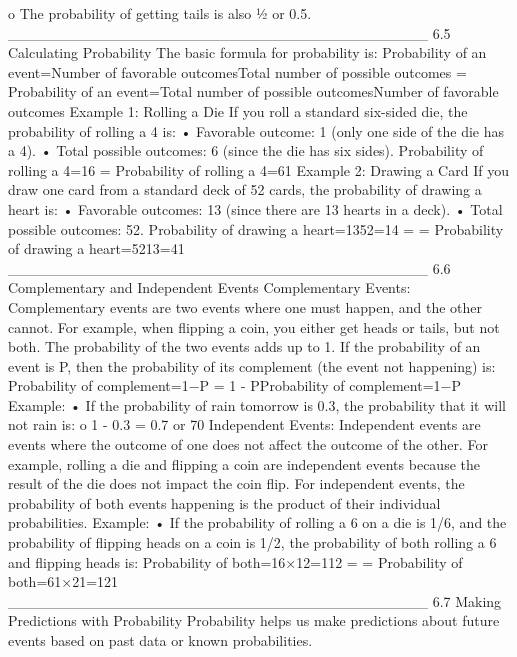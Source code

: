 o	The probability of getting tails is also ½ or 0.5.
________________________________________
6.5 Calculating Probability
The basic formula for probability is:
Probability of an event=Number of favorable outcomesTotal number of possible outcomes = Probability of an event=Total number of possible outcomesNumber of favorable outcomes
Example 1: Rolling a Die
If you roll a standard six-sided die, the probability of rolling a 4 is:
•	Favorable outcome: 1 (only one side of the die has a 4).
•	Total possible outcomes: 6 (since the die has six sides).
Probability of rolling a 4=16 = Probability of rolling a 4=61
Example 2: Drawing a Card
If you draw one card from a standard deck of 52 cards, the probability of drawing a heart is:
•	Favorable outcomes: 13 (since there are 13 hearts in a deck).
•	Total possible outcomes: 52.
Probability of drawing a heart=1352=14 =  = Probability of drawing a heart=5213=41
________________________________________
6.6 Complementary and Independent Events
Complementary Events:
Complementary events are two events where one must happen, and the other cannot. For example, when flipping a coin, you either get heads or tails, but not both. The probability of the two events adds up to 1.
If the probability of an event is P, then the probability of its complement (the event not happening) is:
Probability of complement=1−P = 1 - PProbability of complement=1−P
Example:
•	If the probability of rain tomorrow is 0.3, the probability that it will not rain is:
o	1 - 0.3 = 0.7 or 70%
Independent Events:
Independent events are events where the outcome of one does not affect the outcome of the other. For example, rolling a die and flipping a coin are independent events because the result of the die does not impact the coin flip.
For independent events, the probability of both events happening is the product of their individual probabilities.
Example:
•	If the probability of rolling a 6 on a die is 1/6, and the probability of flipping heads on a coin is 1/2, the probability of both rolling a 6 and flipping heads is: Probability of both=16×12=112 =  \times {} = Probability of both=61×21=121
________________________________________
6.7 Making Predictions with Probability
Probability helps us make predictions about future events based on past data or known probabilities.
